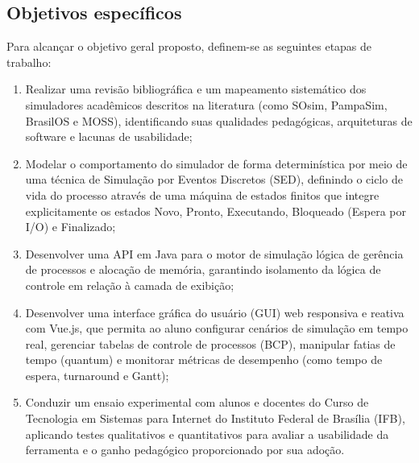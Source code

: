 \subsection{Objetivos específicos}
Para alcançar o objetivo geral proposto, definem-se as seguintes etapas de trabalho:
\begin{enumerate}
    \item Realizar uma revisão bibliográfica e um mapeamento sistemático dos simuladores acadêmicos descritos na literatura (como SOsim, PampaSim, BrasilOS e MOSS), identificando suas qualidades pedagógicas, arquiteturas de software e lacunas de usabilidade;
    \item Modelar o comportamento do simulador de forma determinística por meio de uma técnica de Simulação por Eventos Discretos (SED), definindo o ciclo de vida do processo através de uma máquina de estados finitos que integre explicitamente os estados Novo, Pronto, Executando, Bloqueado (Espera por I/O) e Finalizado;
    \item Desenvolver uma API em Java para o motor de simulação lógica de gerência de processos e alocação de memória, garantindo isolamento da lógica de controle em relação à camada de exibição;
    \item Desenvolver uma interface gráfica do usuário (GUI) web responsiva e reativa com Vue.js, que permita ao aluno configurar cenários de simulação em tempo real, gerenciar tabelas de controle de processos (BCP), manipular fatias de tempo (quantum) e monitorar métricas de desempenho (como tempo de espera, turnaround e Gantt);
    \item Conduzir um ensaio experimental com alunos e docentes do Curso de Tecnologia em Sistemas para Internet do Instituto Federal de Brasília (IFB), aplicando testes qualitativos e quantitativos para avaliar a usabilidade da ferramenta e o ganho pedagógico proporcionado por sua adoção.
\end{enumerate}

